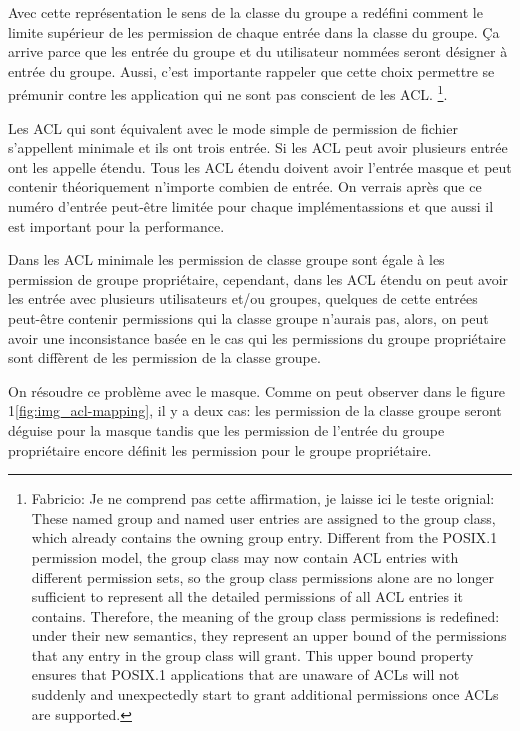 Avec cette représentation le sens de la classe du groupe a redéfini comment le limite supérieur de les permission de chaque entrée dans la classe du groupe. Ça arrive parce que les entrée du groupe et du utilisateur nommées seront désigner à entrée du groupe. Aussi, c'est importante rappeler que cette choix permettre se prémunir contre les application qui ne sont pas conscient de les ACL.
\footnote{Fabricio: Je ne comprend pas cette affirmation, je laisse ici le teste orignial: 
These named group and named user entries are assigned to the group class, which already contains the owning group entry. Different from the POSIX.1 permission model, the group class may now contain ACL entries with different permission sets, so the group class permissions alone are no longer sufficient to represent all the detailed permissions of all ACL entries it contains. Therefore, the meaning of the group class permissions is redefined: under their new semantics, they represent an upper bound of the permissions that any entry in the group class will grant. This upper bound property ensures that POSIX.1 applications that are unaware of ACLs will not suddenly and unexpectedly start to grant additional permissions once ACLs are supported.}.

Les ACL qui sont équivalent avec le mode simple de permission de fichier s'appellent minimale et ils ont trois entrée. Si les ACL peut avoir plusieurs entrée ont les appelle étendu. Tous les ACL étendu doivent avoir l'entrée masque et peut contenir théoriquement n'importe combien de entrée. On verrais après que ce numéro d'entrée peut-être limitée pour chaque implémentassions et que aussi il est important pour la performance.

Dans les ACL minimale les permission de classe groupe sont égale à les permission de groupe propriétaire, cependant, dans les ACL étendu on peut avoir les entrée avec plusieurs utilisateurs et/ou groupes, quelques de cette entrées peut-être contenir permissions qui la classe groupe n'aurais pas, alors, on peut avoir une inconsistance basée en le cas qui les permissions du groupe propriétaire sont diffèrent de les permission de la classe groupe. 

On résoudre ce problème avec le masque. Comme on peut observer dans le figure 1\ref{fig:img_acl-mapping}, il y a deux cas: les permission de la classe groupe seront déguise pour la masque tandis que les permission de l'entrée du groupe propriétaire encore définit les permission pour le groupe propriétaire.    


